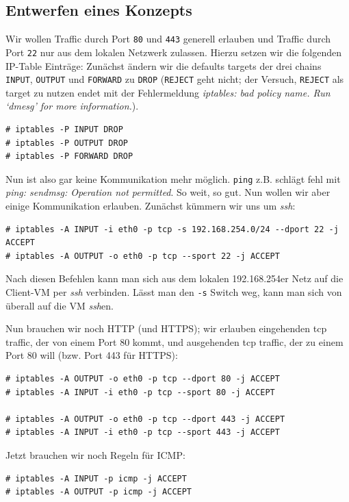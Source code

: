 \documentclass[10pt,a4paper]{article}
\begin{document}
\subsection{Entwerfen eines Konzepts}
Wir wollen Traffic durch Port \texttt{80} und \texttt{443} generell erlauben und Traffic durch Port \texttt{22} nur aus dem lokalen Netzwerk zulassen. Hierzu setzen wir die folgenden IP-Table Einträge:
Zunächst ändern wir die defaults targets der drei chains \texttt{INPUT}, \texttt{OUTPUT} und \texttt{FORWARD} zu \texttt{DROP} (\texttt{REJECT} geht nicht;
der Versuch, \texttt{REJECT} als target zu nutzen endet mit der Fehlermeldung \textit{iptables: bad policy name. Run `dmesg' for more information.}).

\begin{verbatim}
# iptables -P INPUT DROP
# iptables -P OUTPUT DROP
# iptables -P FORWARD DROP
\end{verbatim}

Nun ist also gar keine Kommunikation mehr möglich. \texttt{ping} z.B. schlägt fehl mit \textit{ping: sendmsg: Operation not permitted}.
So weit, so gut. Nun wollen wir aber einige Kommunikation erlauben. Zunächst kümmern wir uns um \textit{ssh}:

\begin{verbatim}
# iptables -A INPUT -i eth0 -p tcp -s 192.168.254.0/24 --dport 22 -j ACCEPT
# iptables -A OUTPUT -o eth0 -p tcp --sport 22 -j ACCEPT
\end{verbatim}

Nach diesen Befehlen kann man sich aus dem lokalen 192.168.254er Netz auf die Client-VM per \textit{ssh} verbinden. Lässt man den \texttt{-s} Switch weg,
kann man sich von überall auf die VM \textit{ssh}en.

Nun brauchen wir noch HTTP (und HTTPS); wir erlauben eingehenden tcp traffic, der von einem Port 80 kommt,
und ausgehenden tcp traffic, der zu einem Port 80 will (bzw. Port 443 für HTTPS):

\begin{verbatim}
# iptables -A OUTPUT -o eth0 -p tcp --dport 80 -j ACCEPT
# iptables -A INPUT -i eth0 -p tcp --sport 80 -j ACCEPT

# iptables -A OUTPUT -o eth0 -p tcp --dport 443 -j ACCEPT
# iptables -A INPUT -i eth0 -p tcp --sport 443 -j ACCEPT
\end{verbatim}

Jetzt brauchen wir noch Regeln für ICMP:

\begin{verbatim}
# iptables -A INPUT -p icmp -j ACCEPT
# iptables -A OUTPUT -p icmp -j ACCEPT
\end{verbatim}
\end{document}
